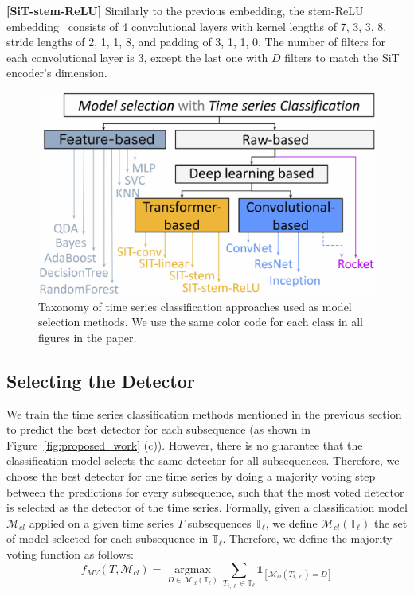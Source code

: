 \noindent\textbf{[SiT-stem-ReLU]}
Similarly to the previous embedding, the stem-ReLU embedding~\cite{wang2022scaled} consists of 4 convolutional layers with kernel lengths of 7, 3, 3, 8, stride lengths of 2, 1, 1, 8, and padding of 3, 1, 1, 0. The number of filters for each convolutional layer is 3, except the last one with $D$ filters to match the SiT encoder's dimension.

\begin{figure}
    \centering
    \includegraphics[width=1\linewidth]{figures/Fig4.jpg}
    \caption{Taxonomy of time series classification approaches used as model selection methods. We use the same color code for each class in all figures in the paper.}
    \label{fig:taxonomy}
\end{figure}


\subsection{Selecting the Detector}

We train the time series classification methods mentioned in the previous section to predict the best detector for each subsequence (as shown in Figure~\ref{fig:proposed_work} (c)). However, there is no guarantee that the classification model selects the same detector for all subsequences. Therefore, we choose the best detector for one time series by doing a majority voting step between the predictions for every subsequence, such that the most voted detector is selected as the detector of the time series. Formally, given a classification model $\mathcal{M}_{cl}$ applied on a given time series $T$ subsequences $\mathbb{T}_\ell$, we define $\mathcal{M}_{cl}(\mathbb{T}_\ell)$ the set of model selected for each subsequence in $\mathbb{T}_\ell$. Therefore, we define the majority voting function as follows:
\begin{equation*}
     f_{MV}(T,\mathcal{M}_{cl}) = \operatorname*{argmax}_{D \in \mathcal{M}_{cl}(\mathbb{T}_\ell)} \sum_{T_{i, \ell} \in \mathbb{T}_\ell} \mathds{1}_{[\mathcal{M}_{cl}(T_{i, \ell}) = D]}
\end{equation*}

